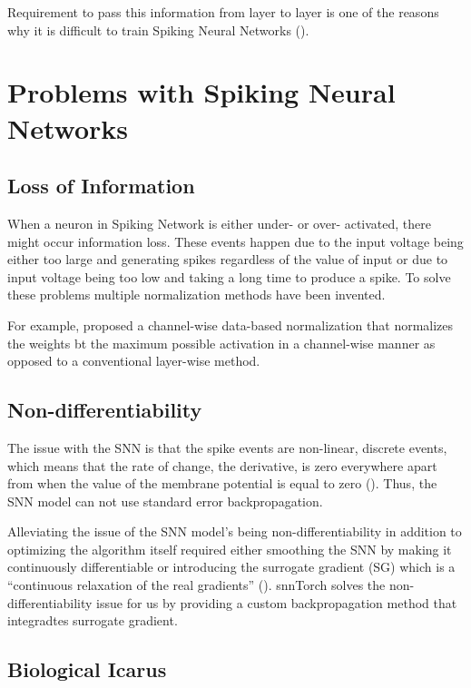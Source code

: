 Requirement to pass this information from layer to layer is one of the reasons why it is difficult to train Spiking Neural Networks (). 

\section{Problems with Spiking Neural Networks}

\subsection{Loss of Information}

When a neuron in Spiking Network is either under- or over- activated, there might occur information loss. These events happen due to the input voltage being either too large and generating spikes regardless of the value of input or due to input voltage being too low and taking a long time to produce a spike. To solve these problems multiple normalization methods have been invented.

For example,  proposed a channel-wise data-based normalization that normalizes the weights bt the maximum possible activation in a channel-wise manner as opposed to a conventional layer-wise method. 

\subsection{Non-differentiability}

The issue with the SNN is that the spike events are non-linear, discrete events, which means that the rate of change, the derivative, is zero everywhere apart from when the value of the membrane potential is equal to zero (). Thus, the SNN model can not use standard error backpropagation.

Alleviating the issue of the SNN model’s being non-differentiability in addition to optimizing the algorithm itself required either smoothing the SNN by making it continuously differentiable or introducing the surrogate gradient (SG) which is a “continuous relaxation of the real gradients” (). snnTorch solves the non-differentiability issue for us by providing a custom backpropagation method that integradtes surrogate gradient. 

\subsection{Biological Icarus}

